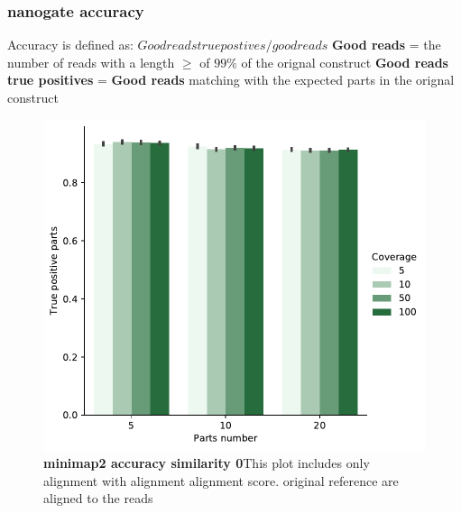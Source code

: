 \documentclass[11pt, a4paper]{article}
\begin{document}
\subsubsection{nanogate accuracy}
Accuracy is defined as:
$Good reads true postives/ good reads$
\textbf{Good reads} = the number of reads with a length $\geq$ of $99\%$ of the orignal construct
\textbf{Good reads true positives} = \textbf{Good reads} matching with the expected parts in the orignal construct

\begin{figure}[ht]
    \begin{center}
    \includegraphics[width=1\textwidth]{../results/images_notebook/v_340/00_minimap2_true_positive.pdf}
    \end{center}
    \caption{{\bf  minimap2 accuracy similarity 0}This plot includes only alignment with alignment alignment score.
    original reference are aligned to the reads }
   \label{fig:v_340_minimap_accuracy_sim_0}
\end{figure}
\end{document}
